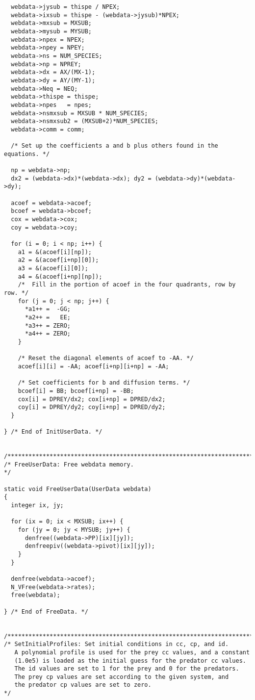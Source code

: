 \documentclass[11pt]{article}
\begin{document}
\begin{verbatim}
  webdata->jysub = thispe / NPEX;
  webdata->ixsub = thispe - (webdata->jysub)*NPEX;
  webdata->mxsub = MXSUB;
  webdata->mysub = MYSUB;
  webdata->npex = NPEX;
  webdata->npey = NPEY;
  webdata->ns = NUM_SPECIES;
  webdata->np = NPREY;
  webdata->dx = AX/(MX-1);
  webdata->dy = AY/(MY-1);
  webdata->Neq = NEQ;
  webdata->thispe = thispe;
  webdata->npes   = npes;
  webdata->nsmxsub = MXSUB * NUM_SPECIES;
  webdata->nsmxsub2 = (MXSUB+2)*NUM_SPECIES;
  webdata->comm = comm;
  
  /* Set up the coefficients a and b plus others found in the equations. */

  np = webdata->np;
  dx2 = (webdata->dx)*(webdata->dx); dy2 = (webdata->dy)*(webdata->dy);

  acoef = webdata->acoef;
  bcoef = webdata->bcoef;
  cox = webdata->cox;
  coy = webdata->coy;

  for (i = 0; i < np; i++) {
    a1 = &(acoef[i][np]);
    a2 = &(acoef[i+np][0]);
    a3 = &(acoef[i][0]);
    a4 = &(acoef[i+np][np]);
    /*  Fill in the portion of acoef in the four quadrants, row by row. */
    for (j = 0; j < np; j++) {
      *a1++ =  -GG;
      *a2++ =   EE;
      *a3++ = ZERO;
      *a4++ = ZERO;
    }

    /* Reset the diagonal elements of acoef to -AA. */
    acoef[i][i] = -AA; acoef[i+np][i+np] = -AA;

    /* Set coefficients for b and diffusion terms. */
    bcoef[i] = BB; bcoef[i+np] = -BB;
    cox[i] = DPREY/dx2; cox[i+np] = DPRED/dx2;
    coy[i] = DPREY/dy2; coy[i+np] = DPRED/dy2;
  }

} /* End of InitUserData. */


/*************************************************************************/
/* FreeUserData: Free webdata memory.                                    */

static void FreeUserData(UserData webdata)
{
  integer ix, jy;

  for (ix = 0; ix < MXSUB; ix++) {
    for (jy = 0; jy < MYSUB; jy++) {
      denfree((webdata->PP)[ix][jy]);
      denfreepiv((webdata->pivot)[ix][jy]);
    }
  }

  denfree(webdata->acoef);
  N_VFree(webdata->rates);
  free(webdata);

} /* End of FreeData. */


/*************************************************************************/
/* SetInitialProfiles: Set initial conditions in cc, cp, and id.
   A polynomial profile is used for the prey cc values, and a constant
   (1.0e5) is loaded as the initial guess for the predator cc values.
   The id values are set to 1 for the prey and 0 for the predators.
   The prey cp values are set according to the given system, and
   the predator cp values are set to zero.                               */


\end{verbatim}
\end{document}
